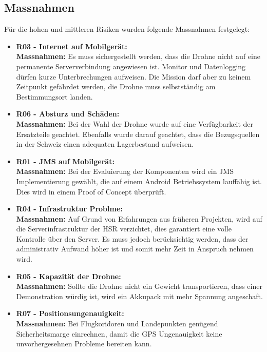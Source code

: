 \subsection{Massnahmen}
Für die hohen und mittleren Risiken wurden folgende Massnahmen festgelegt:
\begin{itemize}
	\item{\textbf{R03 - Internet auf Mobilgerät:} \\
	\textbf{Massnahmen:} Es muss sichergestellt werden, dass die Drohne nicht auf eine permanente Serververbindung angewiesen ist. Monitor und Datenlogging dürfen kurze Unterbrechungen aufweisen. Die Mission darf aber zu keinem Zeitpunkt gefährdet werden, die Drohne muss selbstständig am Bestimmungsort landen.}
	
	\item{\textbf{R06 - Absturz und Schäden:} \\
	\textbf{Massnahmen:} Bei der Wahl der Drohne wurde auf eine Verfügbarkeit der Ersatzteile geachtet. Ebenfalls wurde darauf geachtet, dass die Bezugsquellen in der Schweiz einen adequaten Lagerbestand aufweisen.}

	\item{\textbf{R01 - JMS auf Mobilgerät:} \\
	\textbf{Massnahmen:} Bei der Evaluierung der Komponenten wird ein JMS Implementierung gewählt, die auf einem Android Betriebssystem lauffähig ist. Dies wird in einem Proof of Concept überprüft.}
	
	\item{\textbf{R04 - Infrastruktur Problme:} \\
	\textbf{Massnahmen:} Auf Grund von Erfahrungen aus früheren Projekten, wird auf die Serverinfrastruktur der HSR verzichtet, dies garantiert eine volle Kontrolle über den Server. Es muss jedoch berücksichtig werden, dass der administrativ Aufwand höher ist und somit mehr Zeit in Anspruch nehmen wird.}
	
	\item{\textbf{R05 - Kapazität der Drohne:} \\
	\textbf{Massnahmen:} Sollte die Drohne nicht ein Gewicht transportieren, dass einer Demonstration würdig ist, wird ein Akkupack mit mehr Spannung angeschaft.}	
	
	\item{\textbf{R07 - Positionsungenauigkeit:} \\
	\textbf{Massnahmen:} Bei Flugkoridoren und Landepunkten genügend Sicherheitsmarge einrechnen, damit die GPS Ungenauigkeit keine unvorhergesehnen Probleme bereiten kann.}
	

\end{itemize}
